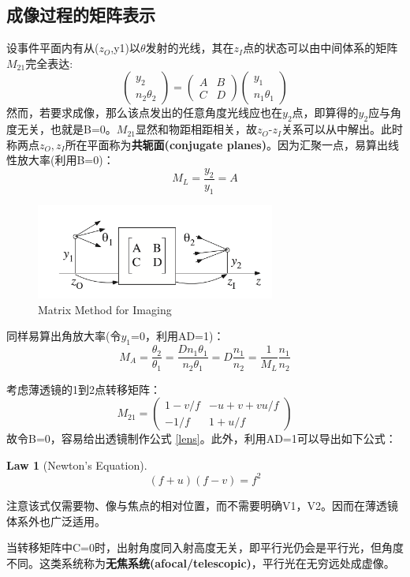 \documentclass[12pt]{ctexart}%
\newtheorem{theorem}{Law}
\begin{document}
\subsection*{成像过程的矩阵表示}
设事件平面内有从($z_O$,y1)以$\theta$发射的光线，其在$z_I$点的状态可以由中间体系的矩阵$M_{21}$完全表达:
\begin{equation}
    \begin{pmatrix}
        y_2\\
        n_2\theta_2
    \end{pmatrix}=\begin{pmatrix}
        A & B \\
        C & D
    \end{pmatrix}\begin{pmatrix}
        y_1\\
        n_1\theta_1
    \end{pmatrix}
\end{equation}
然而，若要求成像，那么该点发出的任意角度光线应也在$y_2$点，即算得的$y_2$应与角度无关，也就是B=0。$M_{21}$显然和物距相距相关，故$z_O$-$z_I$关系可以从中解出。此时称两点$z_O,z_I$所在平面称为\textbf{共轭面(conjugate planes)}。因为汇聚一点，易算出线性放大率(利用B=0)：
\begin{equation}
    M_L=\frac{y_2}{y_1}=A
\end{equation}
\begin{figure}[t] %
    \centering
    \includegraphics[width=0.7\textwidth]{Image/2_Matrix.png}
    \caption{Matrix Method for Imaging}
    \label{Matrix}
\end{figure}
同样易算出角放大率(令$y_1$=0，利用AD=1)：
\begin{equation}
    M_A=\frac{\theta_2}{\theta_1}=\frac{Dn_1\theta_1}{n_2\theta_1}=D\frac{n_1}{n_2}=\frac{1}{M_L}\frac{n_1}{n_2}
\end{equation}
\par 考虑薄透镜的1到2点转移矩阵：
\begin{equation}
    M_{21}=\begin{pmatrix}
        1-v/f & -u+v+vu/f \\
        -1/f & 1+u/f
    \end{pmatrix}
\end{equation}
故令B=0，容易给出透镜制作公式 \ref{lens}。此外，利用AD=1可以导出如下公式：
\begin{theorem}[Newton's Equation]\label{Newton}
    \[(f+u)(f-v)=f^2\]
\end{theorem}
注意该式仅需要物、像与焦点的相对位置，而不需要明确V1，V2。因而在薄透镜体系外也广泛适用。
\par 当转移矩阵中C=0时，出射角度同入射高度无关，即平行光仍会是平行光，但角度不同。这类系统称为\textbf{无焦系统(afocal/telescopic)}，平行光在无穷远处成虚像。
\end{document}
